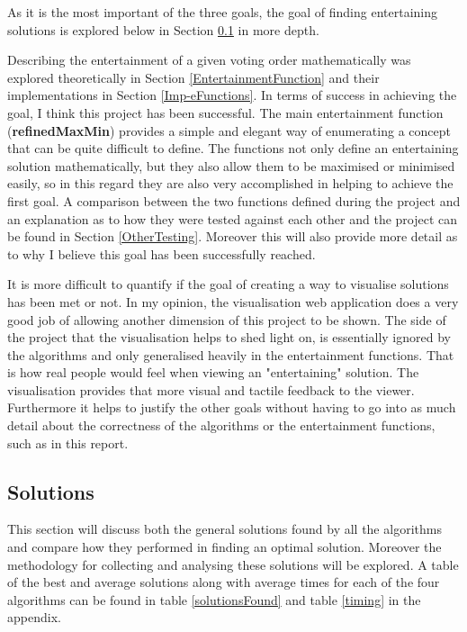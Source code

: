 \documentclass[12pt]{report}
\begin{document}
As it is the most important of the three goals, the goal of finding entertaining solutions is explored below in Section \ref{solutions} in more depth.

Describing the entertainment of a given voting order mathematically was explored theoretically in Section \ref{EntertainmentFunction} and their implementations in Section \ref{Imp-eFunctions}. In terms of success in achieving the goal, I think this project has been successful. The main entertainment function (\textbf{refinedMaxMin}) provides a simple and elegant way of enumerating a concept that can be quite difficult to define. The functions not only define an entertaining solution mathematically, but they also allow them to be maximised or minimised easily, so in this regard they are also very accomplished in helping to achieve the first goal. A comparison between the two functions defined during the project and an explanation as to how they were tested against each other and the project can be found in Section \ref{OtherTesting}. Moreover this will also provide more detail as to why I believe this goal has been successfully reached.

It is more difficult to quantify if the goal of creating a way to visualise solutions has been met or not. In my opinion, the visualisation web application does a very good job of allowing another dimension of this project to be shown. The side of the project that the visualisation helps to shed light on, is essentially ignored by the algorithms and only generalised heavily in the entertainment functions. That is how real people would feel when viewing an "entertaining" solution. The visualisation provides that more visual and tactile feedback to the viewer. Furthermore it helps to justify the other goals without having to go into as much detail about the correctness of the algorithms or the entertainment functions, such as in this report.

\subsection{Solutions}\label{solutions}
This section will discuss both the general solutions found by all the algorithms and compare how they performed in finding an optimal solution. Moreover the methodology for collecting and analysing these solutions will be explored. A table of the best and average solutions along with average times for each of the four algorithms can be found in table \ref{solutionsFound} and table \ref{timing} in the appendix. 
\end{document}

